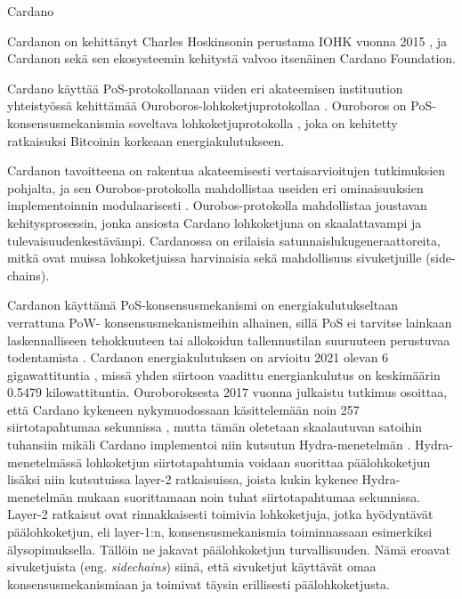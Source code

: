 \begin{subsection}{Cardano\label{cardano}}

Cardanon on kehittänyt Charles Hoskinsonin perustama IOHK vuonna 2015 \cite{cardanowhitepaper, iohk}, ja Cardanon sekä sen ekosysteemin kehitystä valvoo itsenäinen Cardano Foundation. 

Cardano käyttää PoS-protokollanaan viiden eri akateemisen instituution yhteistyössä kehittämää Ouroboros-lohkoketjuprotokollaa \cite{cardanowhitepaper}. Ouroboros on PoS-konsensusmekanismia soveltava lohkoketjuprotokolla \cite{cardano-ouroboros}, joka on kehitetty ratkaisuksi Bitcoinin korkeaan energiakulutukseen.

Cardanon tavoitteena on rakentua akateemisesti vertaisarvioitujen tutkimuksien pohjalta, ja sen Ourobos-protokolla mahdollistaa useiden eri ominaisuuksien implementoinnin modulaarisesti \cite{cardanowhitepaper}. Ourobos-protokolla mahdollistaa joustavan kehitysprosessin, jonka ansiosta Cardano lohkoketjuna on skaalattavampi ja tulevaisuudenkestävämpi. Cardanossa on erilaisia satunnaislukugeneraattoreita, mitkä ovat muissa lohkoketjuissa harvinaisia sekä mahdollisuus sivuketjuille (side-chains).

Cardanon käyttämä PoS-konsensusmekanismi on energiakulutukseltaan verrattuna PoW- konsensusmekanismeihin alhainen, sillä PoS ei tarvitse lainkaan laskennalliseen tehokkuuteen tai allokoidun tallennustilan suuruuteen perustuvaa todentamista \cite{cardanowhitepaper}. Cardanon energiakulutuksen on arvioitu 2021 olevan 6 gigawattituntia \cite{cardanoenergy}, missä yhden siirtoon vaadittu energiankulutus on keskimäärin 0.5479 kilowattituntia. Ouroboroksesta 2017 vuonna julkaistu tutkimus osoittaa, että Cardano kykeneen nykymuodossaan käsittelemään noin 257 siirtotapahtumaa sekunnissa \cite{cardano-tps}, mutta tämän oletetaan skaalautuvan satoihin tuhansiin mikäli Cardano implementoi niin kutsutun Hydra-menetelmän \cite{cardano-hydra}. Hydra-menetelmässä lohkoketjun siirtotapahtumia voidaan suorittaa päälohkoketjun lisäksi niin kutsutuissa layer-2 ratkaisuissa, joista kukin kykenee Hydra-menetelmän mukaan suorittamaan noin tuhat siirtotapahtumaa sekunnissa. Layer-2 ratkaisut ovat rinnakkaisesti toimivia lohkoketjuja, jotka hyödyntävät päälohkoketjun, eli layer-1:n, konsensusmekanismia toiminnassaan esimerkiksi älysopimuksella. Tällöin ne jakavat päälohkoketjun turvallisuuden. Nämä eroavat sivuketjuista (eng. \textit{sidechains}) siinä, että sivuketjut käyttävät omaa konsensusmekanismiaan ja toimivat täysin erillisesti päälohkoketjusta.

\end{subsection}